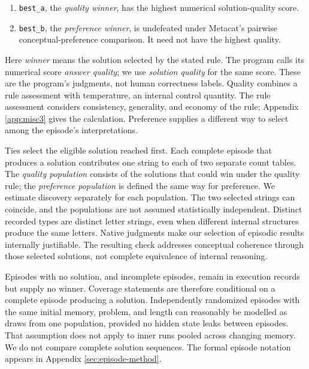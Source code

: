 \documentclass[10pt,letterpaper]{article}
\newcommand{\tightlist}{\setlength{\itemsep}{0pt}\setlength{\parskip}{0pt}}
\begin{document}
\begin{enumerate}
\def\labelenumi{\arabic{enumi}.}
\tightlist
\item
  \texttt{best\_a}, the \emph{quality winner}, has the highest numerical solution-quality
  score.
\item
  \texttt{best\_b}, the \emph{preference winner}, is undefeated under Metacat's pairwise
  conceptual-preference comparison. It need not have the highest quality.
\end{enumerate}

Here \emph{winner} means the solution selected by the stated rule. The program calls its
numerical score \emph{answer quality}; we use \emph{solution quality} for the same score.
These are the program's judgments, not human correctness labels. Quality combines a rule
assessment with temperature, an internal control quantity. The rule assessment considers
consistency, generality, and economy of the rule; Appendix \ref{app:misc3} gives the
calculation. Preference supplies a different way to select among the episode's
interpretations.

Ties select the eligible solution reached first. Each complete episode that produces a
solution contributes one string to each of two separate count tables. The \emph{quality
population} consists of the solutions that could win under the quality rule; the
\emph{preference population} is defined the same way for preference. We estimate discovery
separately for each population. The two selected strings can coincide, and the populations
are not assumed statistically independent. Distinct recorded types are distinct letter
strings, even when different internal structures produce the same letters. Native
judgments make our selection of episodic results internally justifiable. The resulting
check addresses conceptual coherence through those selected solutions, not complete
equivalence of internal reasoning.

Episodes with no solution, and incomplete episodes, remain in execution records but supply
no winner. Coverage statements are therefore conditional on a complete episode producing a
solution. Independently randomized episodes with the same initial memory, problem, and
length can reasonably be modelled as draws from one population, provided no hidden state
leaks between episodes. That assumption does not apply to inner runs pooled across
changing memory. We do not compare complete solution sequences. The formal episode
notation appears in Appendix \ref{sec:episode-method}.
\end{document}
